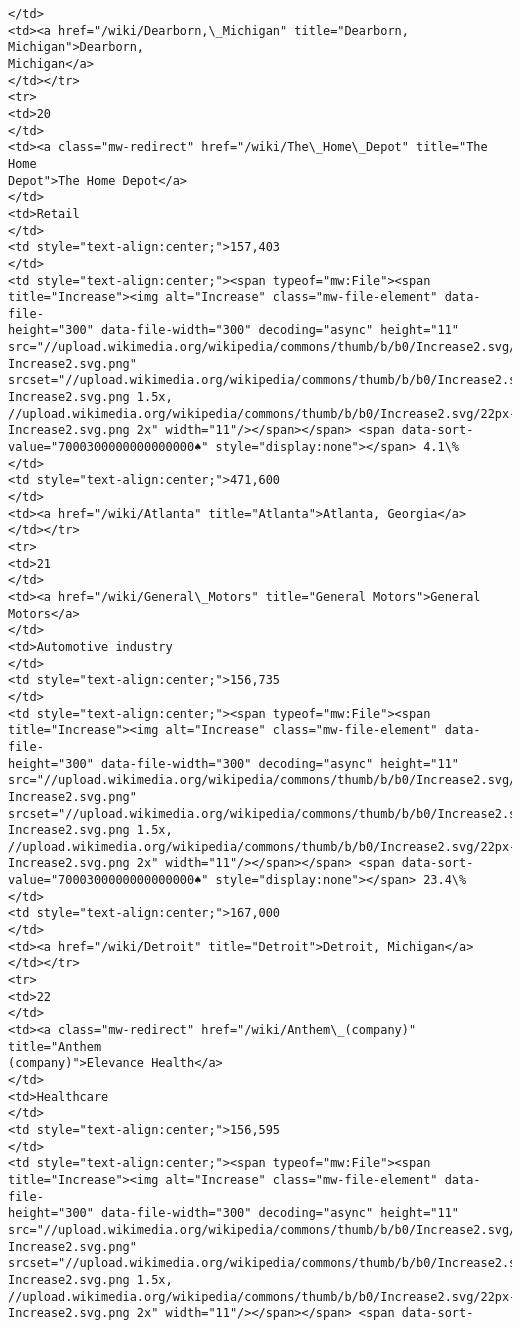 \documentclass[11pt]{article}
\begin{document}
\begin{Verbatim}[commandchars=\\\{\}]
</td>
<td><a href="/wiki/Dearborn,\_Michigan" title="Dearborn, Michigan">Dearborn,
Michigan</a>
</td></tr>
<tr>
<td>20
</td>
<td><a class="mw-redirect" href="/wiki/The\_Home\_Depot" title="The Home
Depot">The Home Depot</a>
</td>
<td>Retail
</td>
<td style="text-align:center;">157,403
</td>
<td style="text-align:center;"><span typeof="mw:File"><span
title="Increase"><img alt="Increase" class="mw-file-element" data-file-
height="300" data-file-width="300" decoding="async" height="11"
src="//upload.wikimedia.org/wikipedia/commons/thumb/b/b0/Increase2.svg/11px-
Increase2.svg.png"
srcset="//upload.wikimedia.org/wikipedia/commons/thumb/b/b0/Increase2.svg/17px-
Increase2.svg.png 1.5x,
//upload.wikimedia.org/wikipedia/commons/thumb/b/b0/Increase2.svg/22px-
Increase2.svg.png 2x" width="11"/></span></span> <span data-sort-
value="7000300000000000000♠" style="display:none"></span> 4.1\%
</td>
<td style="text-align:center;">471,600
</td>
<td><a href="/wiki/Atlanta" title="Atlanta">Atlanta, Georgia</a>
</td></tr>
<tr>
<td>21
</td>
<td><a href="/wiki/General\_Motors" title="General Motors">General Motors</a>
</td>
<td>Automotive industry
</td>
<td style="text-align:center;">156,735
</td>
<td style="text-align:center;"><span typeof="mw:File"><span
title="Increase"><img alt="Increase" class="mw-file-element" data-file-
height="300" data-file-width="300" decoding="async" height="11"
src="//upload.wikimedia.org/wikipedia/commons/thumb/b/b0/Increase2.svg/11px-
Increase2.svg.png"
srcset="//upload.wikimedia.org/wikipedia/commons/thumb/b/b0/Increase2.svg/17px-
Increase2.svg.png 1.5x,
//upload.wikimedia.org/wikipedia/commons/thumb/b/b0/Increase2.svg/22px-
Increase2.svg.png 2x" width="11"/></span></span> <span data-sort-
value="7000300000000000000♠" style="display:none"></span> 23.4\%
</td>
<td style="text-align:center;">167,000
</td>
<td><a href="/wiki/Detroit" title="Detroit">Detroit, Michigan</a>
</td></tr>
<tr>
<td>22
</td>
<td><a class="mw-redirect" href="/wiki/Anthem\_(company)" title="Anthem
(company)">Elevance Health</a>
</td>
<td>Healthcare
</td>
<td style="text-align:center;">156,595
</td>
<td style="text-align:center;"><span typeof="mw:File"><span
title="Increase"><img alt="Increase" class="mw-file-element" data-file-
height="300" data-file-width="300" decoding="async" height="11"
src="//upload.wikimedia.org/wikipedia/commons/thumb/b/b0/Increase2.svg/11px-
Increase2.svg.png"
srcset="//upload.wikimedia.org/wikipedia/commons/thumb/b/b0/Increase2.svg/17px-
Increase2.svg.png 1.5x,
//upload.wikimedia.org/wikipedia/commons/thumb/b/b0/Increase2.svg/22px-
Increase2.svg.png 2x" width="11"/></span></span> <span data-sort-

\end{Verbatim}
\end{document}
